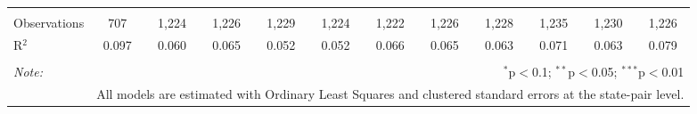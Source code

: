 \begin{table}[!htbp]
\begin{tabular}{@{\extracolsep{5pt}}lccccccccccc}
\hline \\[-1.8ex] 
Observations & 707 & 1,224 & 1,226 & 1,229 & 1,224 & 1,222 & 1,226 & 1,228 & 1,235 & 1,230 & 1,226 \\ 
R$^{2}$ & 0.097 & 0.060 & 0.065 & 0.052 & 0.052 & 0.066 & 0.065 & 0.063 & 0.071 & 0.063 & 0.079 \\ 
\hline 
\hline \\[-1.8ex] 
\textit{Note:}  & \multicolumn{11}{r}{$^{*}$p$<$0.1; $^{**}$p$<$0.05; $^{***}$p$<$0.01} \\ 
 & \multicolumn{11}{r}{All models are estimated with Ordinary Least Squares and clustered standard errors at the state-pair level.} \\ 
\end{tabular} 
\end{table} 
